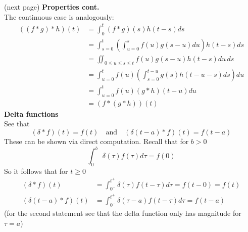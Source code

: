 \documentclass{report}
\begin{document}
(next page)\newpage
\noindent\textbf{Properties cont.}\\
The continuous case is analogously:
\begin{align*}
((f*g)*h)(t)&=\int^t_0(f*g)(s)h(t-s)ds\\
&=\int^t_{s=0}\left(\int^s_{u=0}f(u)g(s-u)du\right)h(t-s)ds\\
&=\iint_{0\leq u\leq s\leq t} f(u)g(s-u)h(t-s)du\,ds\\
&=\int^t_{u=0}f(u)\left(\int^{t-u}_{s=0}g(s)h(t-u-s)ds\right)du\\
&=\int^t_{u=0}f(u)(g*h)(t-u)du\\
&=(f*(g*h))(t)
\end{align*}
\textbf{Delta functions}\\
See that
\begin{equation*}
(\delta*f)(t)=f(t)\quad\text{and}\quad(\delta(t-a)*f)(t)=f(t-a)
\end{equation*}
These can be shown via direct computation. Recall that for $b>0$
\begin{equation*}
\int^b_{0^-}\delta(\tau)f(\tau)d\tau=f(0)
\end{equation*}
So it follows that for $t\geq0$
\begin{align*}
(\delta*f)(t)&=\int^{t^+}_{0^-}\delta(\tau)f(t-\tau)d\tau=
f(t-0)=f(t)\\
(\delta(t-a)*f)(t)&=\int^{t^+}_{0^-}\delta(\tau-a)f(t-\tau)d\tau=f(t-a)
\end{align*}
(for the second statement see that the delta function only has magnitude for $\tau=a$) 
\newpage
\end{document}
